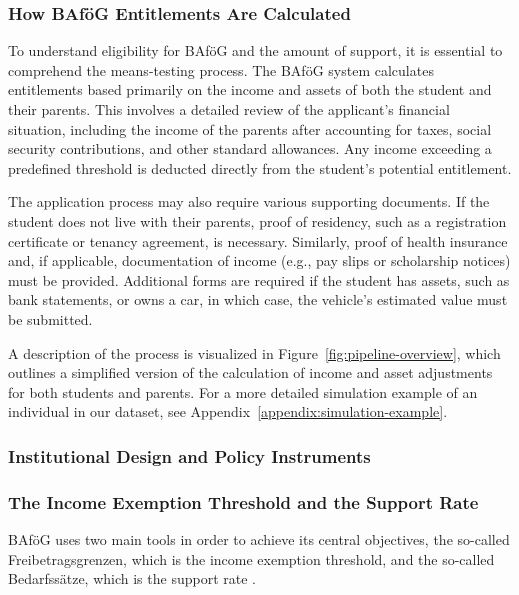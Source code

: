 \subsubsection{How BAföG Entitlements Are Calculated}
\label{subsection:how-bafog-entitlement-is-calculated}
To understand eligibility for BAföG and the amount of support, it is essential to comprehend the means-testing process. 
The BAföG system calculates entitlements based primarily on the income and assets of both the student and their parents. 
This involves a detailed review of the applicant’s financial situation, including the income of the parents after accounting for taxes, social security contributions, and other standard allowances. 
Any income exceeding a predefined threshold is deducted directly from the student’s potential entitlement.

The application process may also require various supporting documents. 
If the student does not live with their parents, proof of residency, such as a registration certificate or tenancy agreement, is necessary. 
Similarly, proof of health insurance and, if applicable, documentation of income (e.g., pay slips or scholarship notices) must be provided. 
Additional forms are required if the student has assets, such as bank statements, or owns a car, in which case, the vehicle’s estimated value must be submitted.

A description of the process is visualized in Figure~\ref{fig:pipeline-overview}, which outlines a simplified version of the calculation of income and asset adjustments for both students and parents.
For a more detailed simulation example of an individual in our dataset, see Appendix~\ref{appendix:simulation-example}.

\subsubsection{Institutional Design and Policy Instruments} 
\label{section:institutional-design-and-policy-instruments}

\subsubsection*{The Income Exemption Threshold and the Support Rate}
\label{subsection:the-income-exemption-threshold-and-the-support-rate}
BAföG uses two main tools in order to achieve its central objectives, the so-called Freibetragsgrenzen, which is the income exemption threshold, and the so-called Bedarfssätze, which is the support rate \citep{meier_bafog_2024}.

